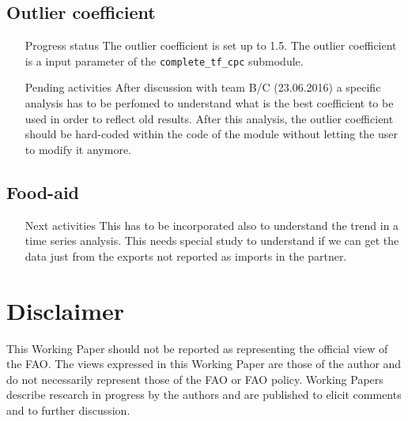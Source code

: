 \documentclass[nojss]{jss}\usepackage[]{graphicx}\usepackage[]{color}
\begin{document}
\subsection{Outlier coefficient}
\begin{itemize}
\item[Progress status] The outlier coefficient is set up to 1.5. The outlier coefficient is a input parameter of the {\tt complete\_tf\_cpc} submodule.
\item[Pending activities] After discussion with team B/C (23.06.2016) a specific analysis has to be perfomed to understand what is the best coefficient to be used in order to reflect old results. After this analysis, the outlier coefficient should be hard-coded within the code of the module without letting the user to modify it anymore.
\end{itemize}


\subsection{Food-aid}
\begin{itemize}
\item[Next activities] This has to be incorporated also to understand the trend in a time series analysis. This needs special study to understand if we can get the data just from the exports not reported as imports in the partner.
\end{itemize}

\section*{Disclaimer}
This Working Paper should not be reported as representing the official view of
the FAO. The views expressed in this Working Paper are those of the
author and do not necessarily represent those of the FAO or FAO
policy. Working Papers describe research in progress by the authors and
are published to elicit comments and to further discussion.\\
\end{document}
